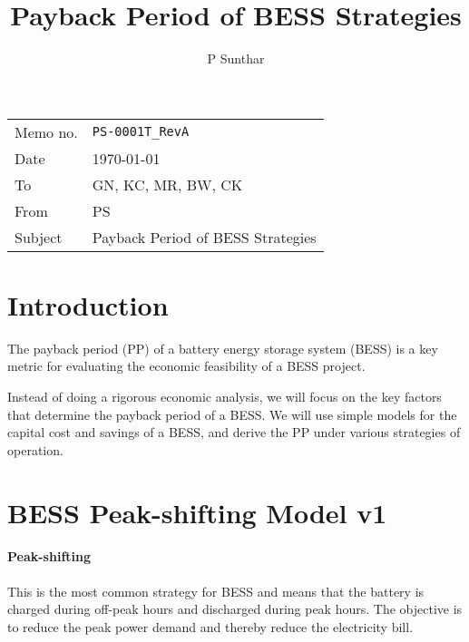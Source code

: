 \documentclass[a4paper]{article}
\begin{document}
\title{Payback Period of BESS Strategies}
\author{P Sunthar}

\maketitle


\begin{tabular}{ll}
Memo no. & \texttt{PS-0001T\_RevA} \\
Date & \today \\
To & GN, KC, MR, BW, CK \\
From & PS \\
Subject & Payback Period of BESS Strategies \\
\end{tabular}


\section{Introduction}

The payback period (PP) of a battery energy storage system
(BESS) is a key metric for evaluating the economic feasibility of a
BESS project. 

Instead of doing a rigorous economic analysis, we will focus on the key
factors that determine the payback period of a BESS. We will use simple models
for the capital cost and savings of a BESS, and derive the PP under
various strategies of operation.


\section{BESS Peak-shifting Model v1}

\paragraph{Peak-shifting} This is the most common strategy for BESS
and means that the battery is charged during off-peak hours and 
discharged during peak hours. The objective is to reduce the peak
power demand and thereby reduce the electricity bill.
\end{document}
